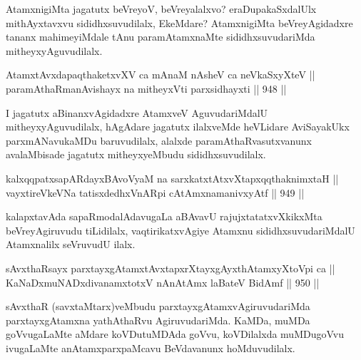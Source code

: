 \begin{artha}
AtamxnigiMta jagatutx beVreyoV, beVreyalalxvo? eraDupakaSxdalUlx mithAyxtavxvu sididhxsuvudilalx, EkeMdare? AtamxnigiMta beVreyAgidadxre tananx mahimeyiMdale tAnu paramAtamxnaMte sididhxsuvudariMda mitheyxyAguvudilalx.
\end{artha}


\begin{shl}
AtamxtAvxdapaqthaketxvXV ca mAnaM nAsheV ca neVkaSxyXteV || \\
paramAthaRmanAvishayx na mitheyxVti parxsidhayxti ||  948 ||  
\end{shl}

\begin{artha}
I jagatutx aBinanxvAgidadxre AtamxveV AguvudariMdalU mitheyxyAguvudilalx, hAgAdare jagatutx ilalxveMde heVLidare AviSayakUkx parxmANavukaMDu baruvudilalx, alalxde paramAthaRvasutxvanunx avalaMbisade jagatutx mitheyxyeMbudu sididhxsuvudilalx.
\end{artha}


\begin{shl}
kalxqqpatxsapARdayxBAvoV\s yaM na sarxkatxtAtxvXtapxqqthaknimxtaH || \\
vayxtireVkeVNa tatisxdedhxVnARpi cA\s \s tAmxnamanivxyAtf ||  949 ||  
\end{shl}

\begin{artha}
kalapxtavAda sapaRmodalAdavugaLa aBAvavU rajujxtatatxvXkikxMta beVreyAgiruvudu tiLidilalx, vaqtirikatxvAgiye Atamxnu sididhxsuvudariMdalU Atamxnalilx seVruvudU ilalx.
\end{artha}


\begin{shl}
sAvxthaRsayx parxtayxgAtamxtAvxtapxrXtayxgAyxthAtamxyXtoV\s pi ca || \\
KaNaDxmuNADxdivanamxtotxV nAnAtAmx laBateV BidAmf ||  950 ||  
\end{shl}

\begin{artha}
sAvxthaR (savxtaMtarx)veMbudu parxtayxgAtamxvAgiruvudariMda parxtayxgAtamxna yathAthaRvu AgiruvudariMda. KaMDa, muMDa goVvugaLaMte aMdare koVDutuMDAda goVvu, koVDilalxda muMDugoVvu ivugaLaMte anAtamxparxpaMcavu BeVdavanunx hoMduvudilalx.
\end{artha}


